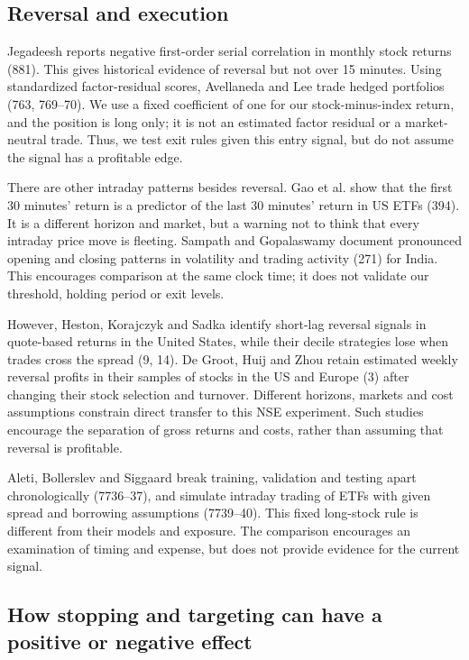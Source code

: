 \documentclass[11pt,a4paper]{article}
\begin{document}
\subsection*{Reversal and execution}

Jegadeesh reports negative first-order serial correlation in monthly stock returns (881). This gives historical evidence of reversal but not over 15 minutes. Using standardized factor-residual scores, Avellaneda and Lee trade hedged portfolios (763, 769--70). We use a fixed coefficient of one for our stock-minus-index return, and the position is long only; it is not an estimated factor residual or a market-neutral trade. Thus, we test exit rules given this entry signal, but do not assume the signal has a profitable edge.

There are other intraday patterns besides reversal. Gao et al. show that the first 30 minutes' return is a predictor of the last 30 minutes' return in US ETFs (394). It is a different horizon and market, but a warning not to think that every intraday price move is fleeting. Sampath and Gopalaswamy document pronounced opening and closing patterns in volatility and trading activity (271) for India. This encourages comparison at the same clock time; it does not validate our threshold, holding period or exit levels.

However, Heston, Korajczyk and Sadka identify short-lag reversal signals in quote-based returns in the United States, while their decile strategies lose when trades cross the spread (9, 14). De Groot, Huij and Zhou retain estimated weekly reversal profits in their samples of stocks in the US and Europe (3) after changing their stock selection and turnover. Different horizons, markets and cost assumptions constrain direct transfer to this NSE experiment. Such studies encourage the separation of gross returns and costs, rather than assuming that reversal is profitable.

Aleti, Bollerslev and Siggaard break training, validation and testing apart chronologically (7736--37), and simulate intraday trading of ETFs with given spread and borrowing assumptions (7739--40). This fixed long-stock rule is different from their models and exposure. The comparison encourages an examination of timing and expense, but does not provide evidence for the current signal.

\subsection*{How stopping and targeting can have a positive or negative effect}
\end{document}
